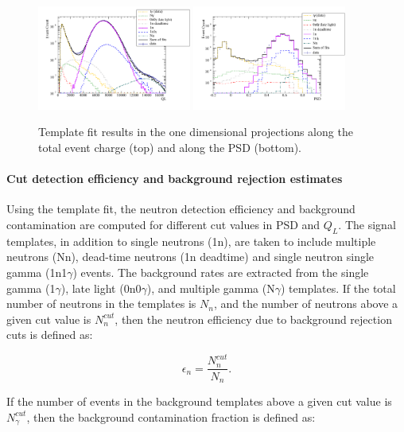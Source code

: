 \documentclass[twocolumn]{bmcart}
\begin{document}
\begin{figure}[!htpb]
\centering 
\includegraphics[width = 0.45\textwidth] {figures/qlfit.pdf} 
\includegraphics[width = 0.45\textwidth] {figures/psdfit.pdf}  
\caption{ Template fit results in the one dimensional projections
  along the total event charge (top) and along the PSD (bottom).}
\label{fig:fits}
\end{figure}


\paragraph{Cut detection efficiency and background rejection estimates}

Using the template fit, the neutron detection efficiency and
background contamination are computed for different cut values in PSD
and $Q_L$.  The signal templates, in addition to single neutrons (1n),
are taken to include multiple neutrons (Nn), dead-time neutrons (1n
deadtime) and single neutron single gamma (1n1$\gamma$) events.  The
background rates are extracted from the single gamma (1$\gamma$), late
light (0n0$\gamma$), and multiple gamma (N$\gamma$) templates.  If the
total number of neutrons in the templates is $N_n$, and the number of
neutrons above a given cut value is $N_n^{cut}$, then the neutron
efficiency due to background rejection cuts is defined as:

\begin{equation}
\epsilon_n = \frac{N_n^{cut}}{N_n}.
\end{equation}

\noindent If the number of events in the background templates above a
given cut value is $N_{\gamma}^{cut}$, then the background
contamination fraction is defined as:
\end{document}
